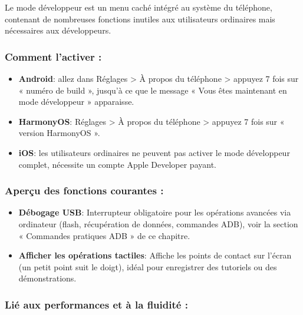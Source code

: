 


Le mode développeur est un menu caché intégré au système du téléphone, contenant de nombreuses fonctions inutiles aux utilisateurs ordinaires mais nécessaires aux développeurs.

\subsubsection*{Comment l'activer :}

\begin{itemize}
  \item \textbf{Android}: allez dans Réglages > À propos du téléphone > appuyez 7 fois sur « numéro de build », jusqu'à ce que le message « Vous êtes maintenant en mode développeur » apparaisse.
  \item \textbf{HarmonyOS}: Réglages > À propos du téléphone > appuyez 7 fois sur « version HarmonyOS ».
  \item \textbf{iOS}: les utilisateurs ordinaires ne peuvent pas activer le mode développeur complet, nécessite un compte Apple Developer payant.
\end{itemize}

\subsubsection*{Aperçu des fonctions courantes :}

\begin{itemize}
  \item \textbf{Débogage USB}: Interrupteur obligatoire pour les opérations avancées via ordinateur (flash, récupération de données, commandes ADB), voir la section « Commandes pratiques ADB » de ce chapitre.
  \item \textbf{Afficher les opérations tactiles}: Affiche les points de contact sur l'écran (un petit point suit le doigt), idéal pour enregistrer des tutoriels ou des démonstrations.
\end{itemize}

\subsubsection*{Lié aux performances et à la fluidité :}

